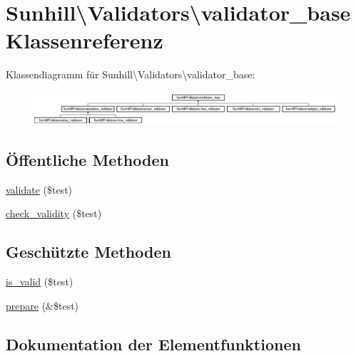 \hypertarget{classSunhill_1_1Validators_1_1validator__base}{}\section{Sunhill\textbackslash{}Validators\textbackslash{}validator\+\_\+base Klassenreferenz}
\label{classSunhill_1_1Validators_1_1validator__base}
Klassendiagramm für Sunhill\textbackslash{}Validators\textbackslash{}validator\+\_\+base\+:\begin{figure}[H]
\begin{center}
\leavevmode
\includegraphics[height=1.244444cm]{d6/dda/classSunhill_1_1Validators_1_1validator__base}
\end{center}
\end{figure}
\subsection*{Öffentliche Methoden}
\begin{DoxyCompactItemize}
\item 
\hyperlink{classSunhill_1_1Validators_1_1validator__base_a897226623a9d3e610cb828246d2a59f8}{validate} (\$test)
\item 
\hyperlink{classSunhill_1_1Validators_1_1validator__base_abf163b87060a30832c5a655ce912d214}{check\+\_\+validity} (\$test)
\end{DoxyCompactItemize}
\subsection*{Geschützte Methoden}
\begin{DoxyCompactItemize}
\item 
\hyperlink{classSunhill_1_1Validators_1_1validator__base_a24e3ec6b05332ecf9079ba77b61dc95d}{is\+\_\+valid} (\$test)
\item 
\hyperlink{classSunhill_1_1Validators_1_1validator__base_aa6187afe619c5ba98b1dd6e3172486bb}{prepare} (\&\$test)
\end{DoxyCompactItemize}


\subsection{Dokumentation der Elementfunktionen}
\mbox{\label{classSunhill_1_1Validators_1_1validator__base_abf163b87060a30832c5a655ce912d214}} 
